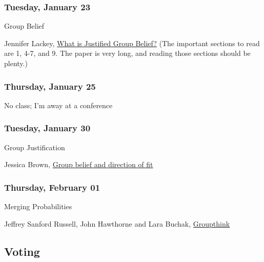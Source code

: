 \documentclass[
  12pt,
  letterpaper,
  DIV=11,
  numbers=noendperiod]{scrartcl}
\providecommand{\tightlist}{%
  \setlength{\itemsep}{0pt}\setlength{\parskip}{0pt}}\usepackage{longtable,booktabs,array}
\begin{document}
\subsubsection{Tuesday, January 23}\label{tuesday-january-23}

\begin{description}
\tightlist
\item[Topic]
Group Belief
\item[Reading]
Jennifer Lackey, \href{https://philpapers.org/rec/LACWIJ}{What is
Justified Group Belief?} (The important sections to read are 1, 4-7, and
9. The paper is very long, and reading those sections should be plenty.)
\end{description}

\subsubsection{Thursday, January 25}\label{thursday-january-25}

No class; I'm away at a conference

\subsubsection{Tuesday, January 30}\label{tuesday-january-30}

\begin{description}
\tightlist
\item[Topic]
Group Justification
\item[Reading]
Jessica Brown, \href{https://philpapers.org/rec/BROGBA-3}{Group belief
and direction of fit}
\end{description}

\subsubsection{Thursday, February 01}\label{thursday-february-01}

\begin{description}
\tightlist
\item[Topic]
Merging Probabilities
\item[Reading]
Jeffrey Sanford Russell, John Hawthorne and Lara Buchak,
\href{https://philpapers.org/rec/RUSG}{Groupthink}
\end{description}

\subsection{Voting}\label{voting}
\end{document}
